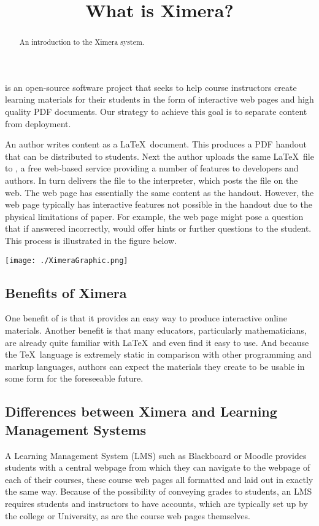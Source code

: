 \documentclass{ximera}
\title{What is Ximera?}
\begin{document}
\begin{abstract}
An introduction to the Ximera system.
\end{abstract}
\maketitle

 is an open-source software
project that seeks to help course instructors create learning
materials for their students in the form of interactive web pages and
high quality PDF documents.  Our strategy to achieve this goal is to
separate content from deployment.

An author writes content as a \LaTeX\ document.  This produces a PDF
handout that can be distributed to students.  Next the author uploads
the same \LaTeX\ file to , a free
web-based service providing a number of features to developers and
authors.  In turn  delivers the
file to the  interpreter, which
  posts the file on the web.  The web page has essentially the same
  content as the handout.  However, the web page typically has
  interactive features not possible in the handout due to the physical
  limitations of paper.  For example, the web page might pose a
  question that if answered incorrectly, would offer hints or further
  questions to the student.  This process is illustrated in the figure
  below.

\begin{image}
\texttt{[image: ./XimeraGraphic.png]}
\end{image}

\subsection{Benefits of Ximera}
One benefit of  is that it
provides an easy way to produce interactive online materials.  Another
benefit is that many educators, particularly mathematicians, are
already quite familiar with \LaTeX\ and even find it easy to use.  And
because the \TeX\ language is extremely static in comparison with
other programming and markup languages, authors can expect the
 materials they create to be
usable in some form for the foreseeable future.

\subsection{Differences between Ximera and Learning Management Systems}
A Learning Management System (LMS) such as Blackboard or Moodle
provides students with a central webpage from which they can navigate
to the webpage of each of their courses, these course web pages all
formatted and laid out in exactly the same way.  Because of the
possibility of conveying grades to students, an LMS requires students
and instructors to have accounts, which are typically set up by the
college or University, as are the course web pages themselves.
\end{document}
